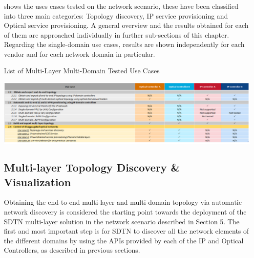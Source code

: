 \documentclass[a4paper,fleqn]{cas-dc}
\begin{document}
 shows the uses cases tested on the network scenario, these have been classified into three main categories: Topology discovery, IP service provisioning and Optical service provisioning. A general overview and the results obtained for each of them are approached individually in further sub-sections of this chapter. Regarding the single-domain use cases, results are shown independently for each vendor and for each network domain in particular.

\begin{table}
	\caption{List of Multi-Layer Multi-Domain Tested Use Cases}
	\centering
		\includegraphics[scale=0.5]{figs/tested_use_cases.png}
	\label{TAB:tested_use_cases}
\end{table}

\subsection{Multi-layer Topology Discovery \& Visualization}
Obtaining the end-to-end multi-layer and multi-domain topology via automatic network discovery is considered the starting point towards the deployment of the SDTN multi-layer solution in the network scenario described in Section 5. The first and most important step is for SDTN to discover all the network elements of the different domains by using the APIs provided by each of the IP and Optical Controllers, as described in previous sections. 
\end{document}
